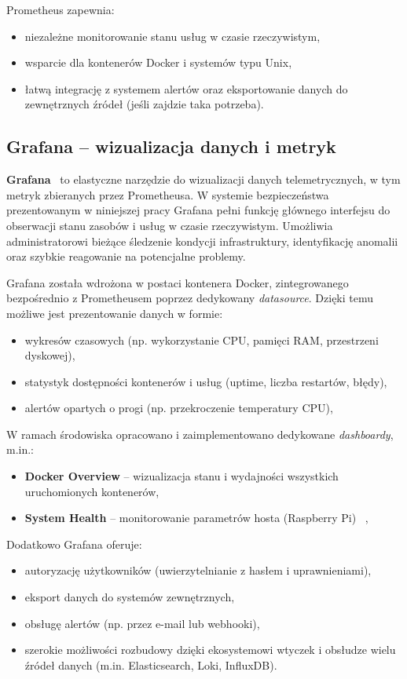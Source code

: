 \documentclass[
    left=2.5cm,         %
    right=2.5cm,        %
    top=2.5cm,          %
    bottom=3cm,         %
    bindingoffset=6mm,  %
    nohyphenation=true %
]{eiti/eiti-thesis} %
\begin{document}
Prometheus zapewnia:
\begin{itemize}
    \item niezależne monitorowanie stanu usług w czasie rzeczywistym,
    \item wsparcie dla kontenerów Docker i systemów typu Unix,
    \item łatwą integrację z systemem alertów oraz eksportowanie danych do zewnętrznych źródeł (jeśli zajdzie taka potrzeba).
\end{itemize}

\subsection{Grafana – wizualizacja danych i metryk}

\textbf{Grafana}~\cite{grafana-docs} to elastyczne narzędzie do wizualizacji danych telemetrycznych, w tym metryk zbieranych przez Prometheusa. W systemie bezpieczeństwa prezentowanym w niniejszej pracy Grafana pełni funkcję głównego interfejsu do obserwacji stanu zasobów i usług w czasie rzeczywistym. Umożliwia administratorowi bieżące śledzenie kondycji infrastruktury, identyfikację anomalii oraz szybkie reagowanie na potencjalne problemy.

Grafana została wdrożona w postaci kontenera Docker, zintegrowanego bezpośrednio z Prometheusem poprzez dedykowany \textit{datasource}. Dzięki temu możliwe jest prezentowanie danych w formie:
\begin{itemize}
    \item wykresów czasowych (np. wykorzystanie CPU, pamięci RAM, przestrzeni dyskowej),
    \item statystyk dostępności kontenerów i usług (uptime, liczba restartów, błędy),
    \item alertów opartych o progi (np. przekroczenie temperatury CPU),
\end{itemize}

W ramach środowiska opracowano i zaimplementowano dedykowane \textit{dashboardy}, m.in.:
\begin{itemize}
    \item \textbf{Docker Overview} – wizualizacja stanu i wydajności wszystkich uruchomionych kontenerów,
    \item \textbf{System Health} – monitorowanie parametrów hosta (Raspberry Pi)~\cite{grafana-raspberry-dashboard} ,
\end{itemize}

Dodatkowo Grafana oferuje:
\begin{itemize}
    \item autoryzację użytkowników (uwierzytelnianie z hasłem i uprawnieniami),
    \item eksport danych do systemów zewnętrznych,
    \item obsługę alertów (np. przez e-mail lub webhooki),
    \item szerokie możliwości rozbudowy dzięki ekosystemowi wtyczek i obsłudze wielu źródeł danych (m.in. Elasticsearch, Loki, InfluxDB).
\end{itemize}
\end{document}
